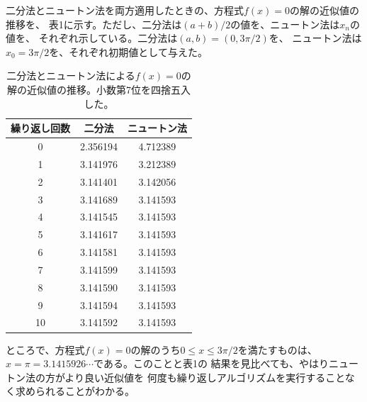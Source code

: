 \documentclass[a4paper, platex, dvipdfmx]{jsarticle}
\begin{document}
二分法とニュートン法を両方適用したときの、方程式$f(x)=0$の解の近似値の推移を、
表1に示す。ただし、二分法は$(a+b)/2$の値を、ニュートン法は$x_n$の値を、
それぞれ示している。二分法は$(a,b)=(0,3\pi/2)$を、
ニュートン法は$x_0=3\pi/2$を、それぞれ初期値として与えた。
\begin{table}
  \centering
  \caption{二分法とニュートン法による$f(x)=0$の解の近似値の推移。小数第7位を四捨五入した。}
  \begin{tabular}{ccc}
    \hline
    繰り返し回数 & 二分法 & ニュートン法 \\\hline
    0 & 2.356194 & 4.712389 \\
    1 & 3.141976 & 3.212389 \\
    2 & 3.141401 & 3.142056 \\
    3 & 3.141689 & 3.141593 \\
    4 & 3.141545 & 3.141593 \\
    5 & 3.141617 & 3.141593 \\
    6 & 3.141581 & 3.141593 \\
    7 & 3.141599 & 3.141593 \\
    8 & 3.141590 & 3.141593 \\
    9 & 3.141594 & 3.141593 \\
    10 & 3.141592 & 3.141593 \\\hline
  \end{tabular}
\end{table}

ところで、方程式$f(x)=0$の解のうち$0\leq x\leq 3\pi/2$を満たすものは、
$x=\pi=3.1415926\cdots$である。このことと表1の
結果を見比べても、やはりニュートン法の方がより良い近似値を
何度も繰り返しアルゴリズムを実行することなく求められることがわかる。
\end{document}
